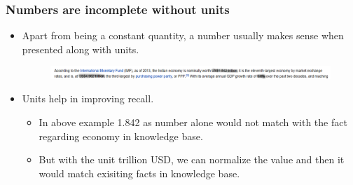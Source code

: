 \documentclass{beamer}
\begin{document}

\begin{frame}
 
 \frametitle{Numbers are incomplete without units} \pause
 
 \begin{itemize}
  
  \item  Apart from being a constant quantity, a number usually makes sense when presented along with units. \pause
  
    \begin{figure}
    \centering
    \includegraphics[width = 1.0\textwidth]{images/ex_6}
  \end{figure}
  \pause 
  \item Units help in improving recall.  \pause
  
  \begin{itemize}
      \item In above example 1.842 as number alone would not match with the fact regarding economy in knowledge base. \pause
      \item But with the unit trillion USD, we can normalize the value and then it would match exisiting facts in knowledge base. 
      
  \end{itemize}
  \end{itemize}
  \end{frame}
\end{document}
